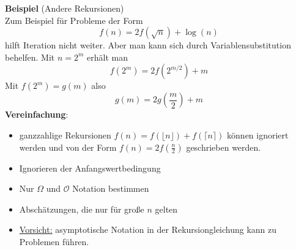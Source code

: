 \documentclass[a4paper, 12pt]{article}
\begin{document}
	\textbf{Beispiel} (Andere Rekursionen)\\
	Zum Beispiel für Probleme der Form \[f(n) = 2f(\sqrt{n}) + \log(n)\] hilft Iteration nicht weiter. Aber man kann sich durch Variablensubstitution behelfen. Mit $n = 2^m$ erhält man \[f(2^m) = 2f(2^{m/2}) + m\] Mit $f(2^m) = g(m)$ also \[g(m) = 2g(\frac{m}{2}) + m\]
	\textbf{Vereinfachung}:\begin{itemize}
		\item ganzzahlige Rekursionen $f(n) = f(\lfloor n\rfloor) + f(\lceil n \rceil)$ können ignoriert werden und von der Form $f(n) = 2f(\frac{n}{2})$ geschrieben werden.
		\item Ignorieren der Anfangswertbedingung
		\item Nur $\Omega$ und $\mathcal{O}$ Notation bestimmen
		\item Abschätzungen, die nur für große $n$ gelten
		\item \underline{Vorsicht:} asymptotische Notation in der Rekursiongleichung kann zu Problemen führen. 
	\end{itemize}
\end{document}
